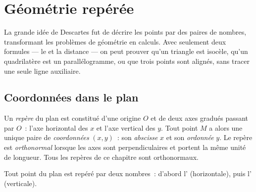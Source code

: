 \chapter{Géométrie repérée}\label{ch:g10:coordgeom}

La grande idée de Descartes fut de décrire les points par des paires de
nombres, transformant les problèmes de géométrie en calculs. Avec
seulement deux formules --- le  et la distance --- on peut prouver
qu'un triangle est isocèle, qu'un quadrilatère est un parallélogramme, ou
que trois points sont alignés, sans tracer une seule ligne auxiliaire.

\section{Coordonnées dans le plan}

\begin{definition}[Repère]\label{def:g10:coordgeom:system}
Un \emph{repère} du plan est constitué d'une origine $O$ et
de deux axes gradués passant par $O$~: l'axe horizontal des $x$ et l'axe
vertical des $y$. Tout point $M$ a alors une unique paire de
\emph{coordonnées} $(x, y)$~: son
\emph{abscisse} $x$ et son
\emph{ordonnée} $y$. Le repère est
\emph{orthonormal} lorsque les axes sont
perpendiculaires et portent la même unité de longueur. Tous les repères
de ce chapitre sont orthonormaux.
\end{definition}

\begin{omfigure}

{\small Tout point du plan est repéré par deux nombres~: d'abord
l' (horizontale), puis l' (verticale).}
\end{omfigure}

